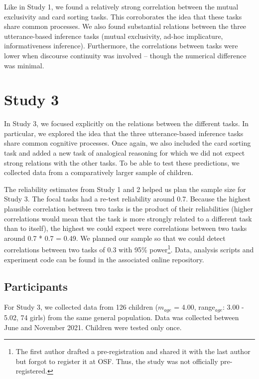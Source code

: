 \documentclass[
  english,
  man,floatsintext]{apa6}
\begin{document}
Like in Study 1, we found a relatively strong correlation between the mutual exclusivity and card sorting tasks. This corroborates the idea that these tasks share common processes. We also found substantial relations between the three utterance-based inference tasks (mutual exclusivity, ad-hoc implicature, informativeness inference). Furthermore, the correlations between tasks were lower when discourse continuity was involved -- though the numerical difference was minimal.

\hypertarget{study-3}{%
\section{Study 3}\label{study-3}}

In Study 3, we focused explicitly on the relations between the different tasks. In particular, we explored the idea that the three utterance-based inference tasks share common cognitive processes. Once again, we also included the card sorting task and added a new task of analogical reasoning for which we did not expect strong relations with the other tasks. To be able to test these predictions, we collected data from a comparatively larger sample of children.

The reliability estimates from Study 1 and 2 helped us plan the sample size for Study 3. The focal tasks had a re-test reliability around 0.7. Because the highest plausible correlation between two tasks is the product of their reliabilities (higher correlations would mean that the task is more strongly related to a different task than to itself), the highest we could expect were correlations between two tasks around 0.7 * 0.7 = 0.49. We planned our sample so that we could detect correlations between two tasks of 0.3 with 95\% power\footnote{The first author drafted a pre-registration and shared it with the last author but forgot to register it at OSF. Thus, the study was not officially pre-registered.}. Data, analysis scripts and experiment code can be found in the associated online repository.

\hypertarget{participants-2}{%
\subsection{Participants}\label{participants-2}}

For Study 3, we collected data from 126 children (\(m_{age}\) = 4.00, range\(_{age}\): 3.00 - 5.02, 74 girls) from the same general population. Data was collected between June and November 2021. Children were tested only once.
\end{document}

